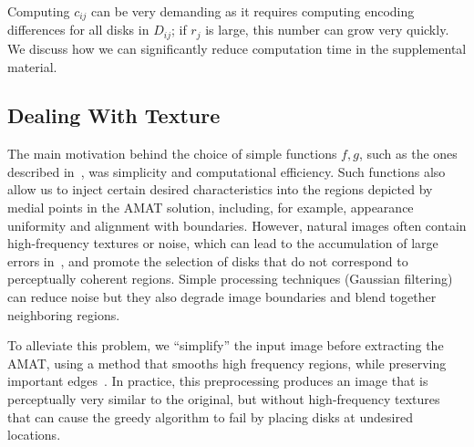 \documentclass[10pt,twocolumn,letterpaper]{article}
\begin{document}
Computing $c_{ij}$ can be very demanding as it requires computing encoding differences for all 
disks in $D_{ij}$; if $r_j$ is large, this number can grow very quickly.
We discuss how we can significantly reduce computation time in the supplemental material.


\subsection{Dealing With Texture}\label{sec:implementation:texture}
The main motivation behind the choice of simple functions $f,g$,
such as the ones described in~, was simplicity and  computational efficiency.
Such functions also allow us to inject certain desired characteristics into the regions depicted by medial points in the AMAT solution, 
including, for example, appearance uniformity and alignment with boundaries.
However, natural images often contain high-frequency textures or noise, which can lead to the accumulation of large errors 
in~, and promote the selection of disks that do not correspond to perceptually coherent regions. 
Simple processing techniques (\eg Gaussian filtering) can reduce noise but they also degrade image boundaries and
blend together neighboring regions.

To alleviate this problem, we ``simplify'' the input image before extracting the AMAT, using a method that smooths high frequency
regions, while preserving important edges~\cite{xu2011image}.
In practice, this preprocessing produces an image that is  perceptually very similar to the original, 
but without high-frequency textures that can cause the greedy algorithm to fail by placing disks at undesired locations.
\end{document}
